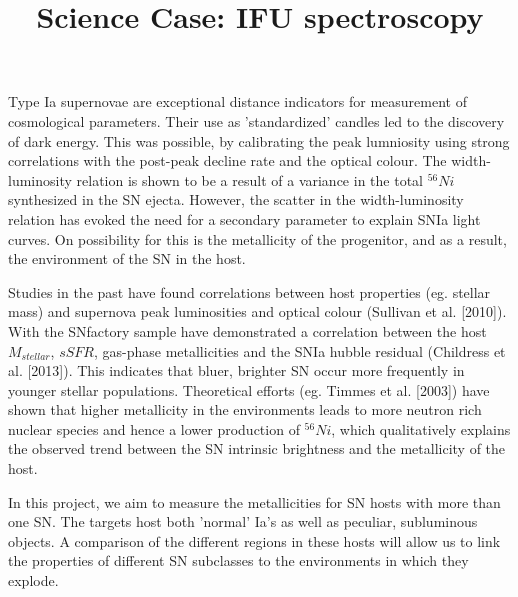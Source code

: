 \documentclass{article}
\begin{document}
\title{Science Case: IFU spectroscopy}
\maketitle
Type Ia supernovae are exceptional distance indicators for measurement of cosmological parameters. Their use as 'standardized' candles led to the discovery of dark energy. This was possible, by calibrating the peak lumniosity using strong correlations with the post-peak decline rate and the optical colour. The width-luminosity relation is shown to be a  result of a variance in the total $^{56}Ni$ synthesized in the SN ejecta. However, the scatter in the width-luminosity relation has evoked the need for a secondary parameter to explain SNIa light curves. On possibility for this is the metallicity of the progenitor, and as a result, the environment of the SN in the host. 

Studies in the past have found correlations between host properties  (eg. stellar mass) and supernova peak luminosities and optical colour (Sullivan et al. [2010]).  With the SNfactory sample have demonstrated a correlation between the host $M_{stellar}$, $sSFR$, gas-phase metallicities and the SNIa hubble residual (Childress et al. [2013]).
This indicates that bluer, brighter SN occur more frequently in younger stellar populations. Theoretical efforts (eg. Timmes et al. [2003]) have shown that higher metallicity in the environments leads to more neutron rich nuclear species and hence a lower production of 
$^{56}Ni$, which qualitatively explains the observed trend between the SN intrinsic brightness and the metallicity of the host. 

In this project, we aim to measure the metallicities for SN hosts with more than one SN. The targets host both 'normal' Ia's as well as peculiar, subluminous objects. A comparison of the different regions in these hosts will allow us to link the properties of different SN subclasses to the environments in which they explode. 
\end{document}
